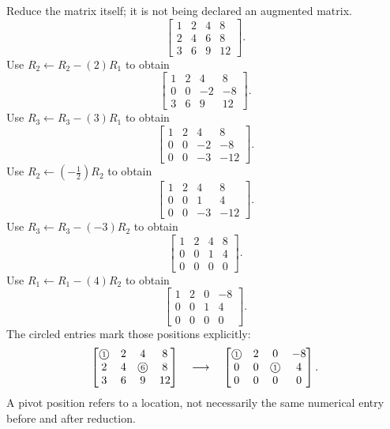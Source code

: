 \goal Reduce the matrix itself; it is not being declared an augmented matrix.
\[ \left[\begin{array}{rrrr}1&2&4&8\\2&4&6&8\\3&6&9&12\end{array}\right].\]
Use $R_{2}\leftarrow R_{2}-(2)R_{1}$ to obtain
\[ \left[\begin{array}{rrrr}1&2&4&8\\0&0&-2&-8\\3&6&9&12\end{array}\right].\]
Use $R_{3}\leftarrow R_{3}-(3)R_{1}$ to obtain
\[ \left[\begin{array}{rrrr}1&2&4&8\\0&0&-2&-8\\0&0&-3&-12\end{array}\right].\]
Use $R_{2}\leftarrow(- \frac{1}{2})R_{2}$ to obtain
\[ \left[\begin{array}{rrrr}1&2&4&8\\0&0&1&4\\0&0&-3&-12\end{array}\right].\]
Use $R_{3}\leftarrow R_{3}-(-3)R_{2}$ to obtain
\[ \left[\begin{array}{rrrr}1&2&4&8\\0&0&1&4\\0&0&0&0\end{array}\right].\]
Use $R_{1}\leftarrow R_{1}-(4)R_{2}$ to obtain
\[ \left[\begin{array}{rrrr}1&2&0&-8\\0&0&1&4\\0&0&0&0\end{array}\right].\]
The circled entries mark those positions explicitly:
\[
\begin{bmatrix}\text{\textcircled{\scriptsize1}}&2&4&8\\2&4&\text{\textcircled{\scriptsize6}}&8\\3&6&9&12\end{bmatrix}
\quad\longrightarrow\quad
\begin{bmatrix}\text{\textcircled{\scriptsize1}}&2&0&-8\\0&0&\text{\textcircled{\scriptsize1}}&4\\0&0&0&0\end{bmatrix}.
\]
A pivot position refers to a location, not necessarily the same numerical
entry before and after reduction.

